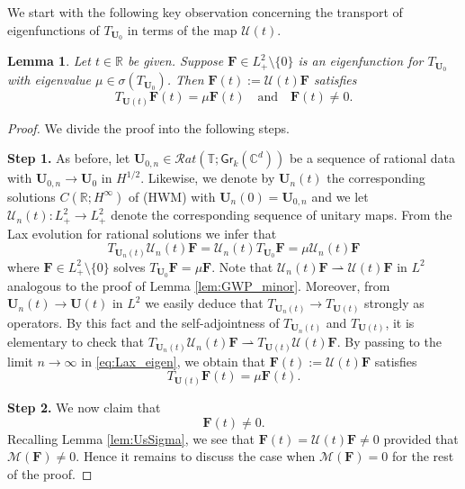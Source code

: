 \documentclass[10pt,reqno,a4paper]{amsart}
\newtheorem{lem}{Lemma}[section]
\theoremstyle{definition}
\theoremstyle{remark}
\theoremstyle{remark}
\numberwithin{equation}{section}
\newcommand{\C}{\mathbb{C}}
\newcommand{\R}{\mathbb{R}}
\newcommand{\T}{\mathbb{T}}
\newcommand{\Mean}{\mathscr{M}}
\newcommand{\be}{\begin{equation}}
\newcommand{\ee}{\end{equation}}
\newcommand{\weakto}{\rightharpoonup}
\newcommand{\Ub}{\mathbf{U}}
\newcommand{\Fb}{\mathbf{F}}
\newcommand{\Gr}{\mathsf{Gr}}
\newcommand{\Us}{\mathscr{U}}
\begin{document}
We start with the following key observation concerning the transport of eigenfunctions of $T_{\Ub_0}$ in terms of the map $\Us(t)$.

\begin{lem} \label{lem:eigenfunctions}
Let $t \in \R$ be given. Suppose $\Fb \in L^2_+ \setminus \{ 0 \}$ is an eigenfunction for $T_{\Ub_0}$ with eigenvalue $\mu \in \sigma(T_{\Ub_0})$. Then $\Fb(t) := \Us(t) \Fb$ satisfies
$$
T_{\Ub(t)} \Fb(t) = \mu \Fb(t) \quad \mbox{and} \quad \Fb(t) \neq 0.
$$
\end{lem}

\begin{proof}
We divide the proof into the following steps.

\medskip
\textbf{Step 1.} As before, let $\Ub_{0,n} \in \mathcal{R}at(\T; \Gr_k(\C^d))$ be a sequence of rational data with $\Ub_{0,n} \to \Ub_0$ in $H^{1/2}$. Likewise, we denote by $\Ub_n(t)$ the corresponding solutions $C(\R; H^\infty)$ of (HWM) with $\Ub_n(0) = \Ub_{0,n}$ and we let $\Us_n(t) : L^2_+ \to L^2_+$ denote the corresponding sequence of unitary maps. From the Lax evolution for rational solutions we infer that
\be \label{eq:Lax_eigen}
T_{\Ub_n(t)} \Us_n(t) \Fb = \Us_n(t) T_{\Ub_0} \Fb = \mu \Us_n(t) \Fb
\ee
where $\Fb \in L^2_+ \setminus \{ 0 \}$ solves $T_{\Ub_0} \Fb = \mu \Fb$. Note that $\Us_n(t) \Fb \weakto \Us(t) \Fb$ in $L^2$ analogous to the proof of Lemma \ref{lem:GWP_minor}. Moreover, from $\Ub_n(t) \to \Ub(t)$ in $L^2$ we easily deduce that $T_{\Ub_n(t)} \to T_{\Ub(t)}$ strongly as operators. By this fact and the self-adjointness of $T_{\Ub_n(t)}$ and $T_{\Ub(t)}$, it is elementary to check that $T_{\Ub_n(t)} \Us_n(t) \Fb \weakto T_{\Ub(t)} \Us(t) \Fb$. By passing to the limit $n \to \infty$ in \eqref{eq:Lax_eigen}, we obtain that $\Fb(t) := \Us(t) \Fb$ satisfies
$$
T_{\Ub(t)} \Fb(t) = \mu \Fb(t) .
$$

\medskip
\textbf{Step 2.} We now claim that 
$$
\Fb(t) \neq 0 .
$$
Recalling Lemma \ref{lem:UsSigma}, we see that $\Fb(t) = \Us(t) \Fb \neq 0$ provided that $\Mean(\Fb) \neq 0$. Hence it remains to discuss the case when $\Mean(\Fb) = 0$ for the rest of the proof.


\end{proof}
\end{document}
